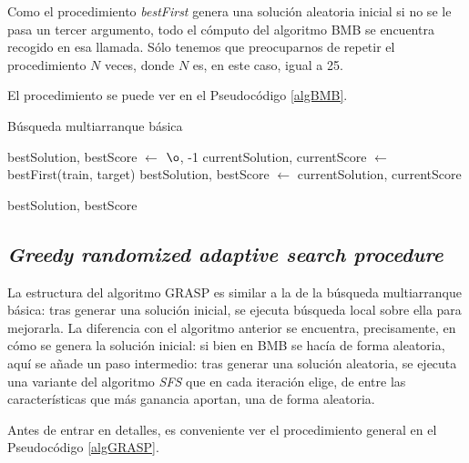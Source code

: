 \documentclass[a4paper, 11pt, titlepage]{article}
\begin{document}
    Como el procedimiento \emph{bestFirst} genera una solución aleatoria inicial si no se le pasa un tercer argumento, todo el cómputo del algoritmo BMB se encuentra recogido en esa llamada. Sólo tenemos que preocuparnos de repetir el procedimiento $N$ veces, donde $N$ es, en este caso, igual a 25.

    El procedimiento se puede ver en el Pseudocódigo \ref{algBMB}.

    \begin{algorithm}
        \caption{Búsqueda multiarranque básica}\label{algBMB}
        \begin{algorithmic}[1]

            \State bestSolution, bestScore $\gets$ $\o$, -1
                \State currentSolution, currentScore $\gets$ bestFirst(train, target)
                \State bestSolution, bestScore $\gets$ currentSolution, currentScore
                \EndIf
            \EndFor

            \State \Return bestSolution, bestScore
            \EndFunction
        \end{algorithmic}
    \end{algorithm}

    \subsection{\emph{Greedy randomized adaptive search procedure}}

    La estructura del algoritmo GRASP es similar a la de la búsqueda multiarranque básica: tras generar una solución inicial, se ejecuta búsqueda local sobre ella para mejorarla. La diferencia con el algoritmo anterior se encuentra, precisamente, en cómo se genera la solución inicial: si bien en BMB se hacía de forma aleatoria, aquí se añade un paso intermedio: tras generar una solución aleatoria, se ejecuta una variante del algoritmo \emph{SFS} que en cada iteración elige, de entre las características que más ganancia aportan, una de forma aleatoria.

    Antes de entrar en detalles, es conveniente ver el procedimiento general en el Pseudocódigo \ref{algGRASP}.
\end{document}
